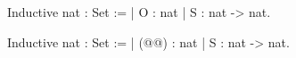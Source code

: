 Inductive nat : Set :=
| O : nat
| S : nat -> nat.

Inductive nat : Set :=
| (@@) : nat
| S : nat -> nat.


